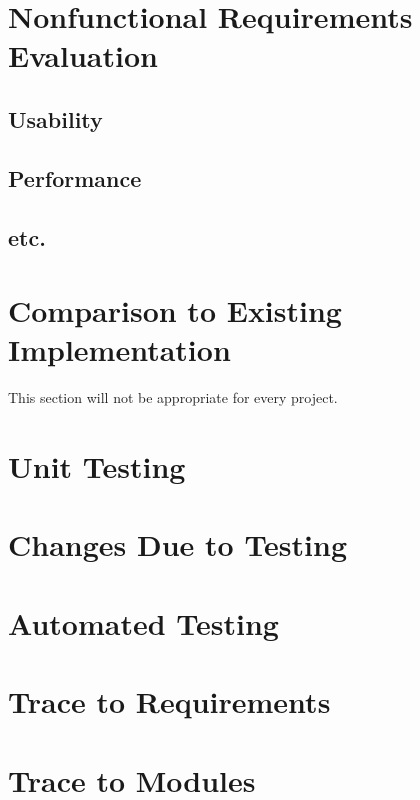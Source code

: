 \documentclass[12pt, titlepage]{article}
\begin{document}
\section{Nonfunctional Requirements Evaluation}

\subsection{Usability}
		
\subsection{Performance}

\subsection{etc.}
	
\section{Comparison to Existing Implementation}	

This section will not be appropriate for every project.

\section{Unit Testing}

\section{Changes Due to Testing}


\section{Automated Testing}
		
\section{Trace to Requirements}
		
\section{Trace to Modules}		
\end{document}
